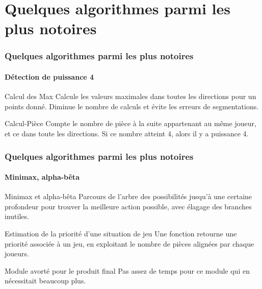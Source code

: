 \documentclass{beamer}
\begin{document}
    \section{Quelques algorithmes parmi les plus notoires}
    \begin{frame}
    \frametitle{Quelques algorithmes parmi les plus notoires}
    \framesubtitle{Détection de puissance 4}
    	\begin{block}{Calcul des Max}
		    Calcule les valeurs maximales dans toutes les directions pour un points donné. Diminue le nombre de calculs et évite les erreurs de segmentations.\\
	\end{block}
	\begin{block}{Calcul-Pièce}
		    Compte le nombre de pièce à la suite appartenant au même joueur, et ce dans toute les directions. Si ce nombre atteint 4, alors il y a puissance 4.\\
	\end{block}
    \end{frame}




    \begin{frame}
    \frametitle{Quelques algorithmes parmi les plus notoires}
    \framesubtitle{Minimax, alpha-bêta}
        \begin{block}{Minimax et alpha-bêta}
            Parcours de l'arbre des possibilités jusqu'à une certaine profondeur pour trouver la meilleure action possible, avec élagage des branches inutiles.
        \end{block}
        \begin{block}{Estimation de la priorité d'une situation de jeu}
            Une fonction retourne une priorité associée à un jeu, en exploitant le nombre de pièces alignées par chaque joueurs.
        \end{block}
        \begin{alertblock}{Module avorté pour le produit final}
            Pas assez de temps pour ce module qui en nécessitait beaucoup plus.
        \end{alertblock}
    \end{frame}



\end{document}
